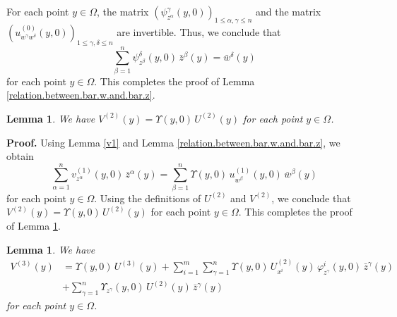 \documentclass[11pt]{amsart}
\newtheorem{lemma}[theorem]{Lemma}
\theoremstyle{definition}
\begin{document}
For each point $y \in \Omega$, the matrix $(\psi^\gamma_{z^\alpha}(y,0))_{1 \leq \alpha,\gamma \leq n}$ and the matrix $(u^{(0)}_{w^\gamma w^\delta}(y,0))_{1 \leq \gamma,\delta \leq n}$ are invertible. Thus, we conclude that 
\[\sum_{\beta=1}^n \psi^\delta_{z^\beta}(y,0) \, \bar{z}^\beta(y) = \bar{w}^\delta(y)\] 
for each point $y \in \Omega$. This completes the proof of Lemma \ref{relation.between.bar.w.and.bar.z}. \\


\begin{lemma}
\label{relation.between.U2.and.V2}
We have $V^{(2)}(y) = \Upsilon(y,0) \, U^{(2)}(y)$ for each point $y \in \Omega$. 
\end{lemma}

\textbf{Proof.} 
Using Lemma \ref{v1} and Lemma \ref{relation.between.bar.w.and.bar.z}, we obtain 
\[\sum_{\alpha=1}^n v^{(1)}_{z^\alpha}(y,0) \, \bar{z}^\alpha(y) = \sum_{\beta=1}^n \Upsilon(y,0) \, u^{(1)}_{w^\beta}(y,0) \, \bar{w}^\beta(y)\] 
for each point $y \in \Omega$. Using the definitions of $U^{(2)}$ and $V^{(2)}$, we conclude that $V^{(2)}(y) = \Upsilon(y,0) \, U^{(2)}(y)$ for each point $y \in \Omega$. This completes the proof of Lemma \ref{relation.between.U2.and.V2}. \\


\begin{lemma}
\label{relation.between.U3.and.V3}
We have 
\begin{align*} 
V^{(3)}(y) 
&= \Upsilon(y,0) \, U^{(3)}(y) + \sum_{i=1}^m \sum_{\gamma=1}^n \Upsilon(y,0) \, U^{(2)}_{x^i}(y) \, \varphi^i_{z^\gamma}(y,0) \, \bar{z}^\gamma(y) \\ 
&+ \sum_{\gamma=1}^n \Upsilon_{z^\gamma}(y,0) \, U^{(2)}(y)  \, \bar{z}^\gamma(y) 
\end{align*}
for each point $y \in \Omega$. 
\end{lemma}
\end{document}
